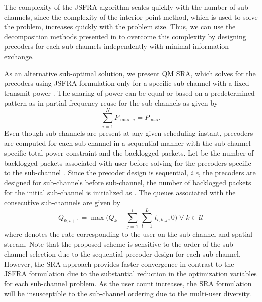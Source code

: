 
The complexity of the \ac{JSFRA} algorithm scales quickly with the number of sub-channels, since the complexity of the interior point method, which is used to solve the problem, increases quickly with the problem size. Thus, we can use the decomposition methods presented in \cite{palomar2006tutorial,boyd2011distributed} to overcome this complexity by designing precoders for each sub-channels independently with minimal information exchange.

As an alternative sub-optimal solution, we present \acl{QM} \ac{SRA}, which solves for the precoders using \ac{JSFRA} formulation only for a specific sub-channel  with a fixed transmit power . The sharing of power can be equal or based on a predetermined pattern as in partial frequency reuse for the sub-channels as given by
\begin{equation}
\sum_{i=1}^N P_{\max,i} = P_{\max}.
\end{equation}
Even though  sub-channels are present at any given scheduling instant, precoders are computed for each sub-channel in a sequential manner with the sub-channel specific total power constraint  and the backlogged packets. Let  be the number of backlogged packets associated with user  before solving for the precoders specific to the sub-channel . Since the precoder design is sequential, \textit{i.e}, the precoders are designed for sub-channels \me{[0,i-1]} before  sub-channel, the number of backlogged packets for the initial sub-channel is initialized as . The queues associated with the consecutive sub-channels are given by
\begin{equation}	\label{eqn-weight}
	Q_{k,i+1} = \max \Big ( Q_k - \sum_{j = 1}^{i} \, \sum_{l = 1}^{L} \, t_{l,k,j} ,0 \Big ) \; \forall \; k \in \mathcal{U}
\end{equation}
where  denotes the rate corresponding to the user  on the  sub-channel and  spatial stream. Note that the proposed scheme is sensitive to the order of the sub-channel selection due to the sequential precoder design for each sub-channel. However, the \ac{SRA} approach provides faster convergence in contrast to the \ac{JSFRA} formulation due to the substantial reduction in the optimization variables for each sub-channel problem. As the user count increases, the \ac{SRA} formulation will be insusceptible to the sub-channel ordering due to the multi-user diversity.
